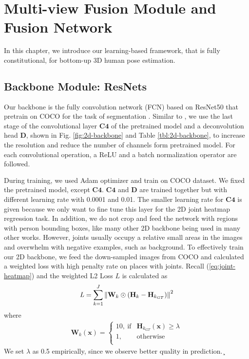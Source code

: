 \chapter{Multi-view Fusion Module and Fusion Network}
In this chapter, we introduce our learning-based framework, that is fully constitutional, for bottom-up 3D human pose estimation. 
\section{Backbone Module: ResNets}
Our backbone is the fully convolution network (FCN) based on ResNet50 that pretrain on COCO for the task of segmentation \cite{resnet50}. Similar to \cite{xiao2018simple}, we use the last stage of the convolutional layer $\bm{C4}$ of the pretrained model and a deconvolution head $\bm{D}$, shown in Fig. \ref{fig:2d-backbone} and Table \ref{tbl:2d-backbone}, to increase the resolution and reduce the number of channels form pretrained model. For each convolutional operation, a ReLU and a batch normalization operator are followed.

During training, we used Adam optimizer and train on COCO dataset. We fixed the pretrained model, except $\bm{C4}$. $\bm{C4}$ and $\bm{D}$ are trained together but with different learning rate with 0.0001 and 0.01. The smaller learning rate for $\bm{C4}$ is given because we only want to fine tune this layer for the 2D joint heatmap regression task. In addition, we do not crop and feed the network with regions with person bounding boxes, like many other 2D backbone being used in many other works. However, joints usually occupy a relative small areas in the images and overwhelm with negative examples, such as background. To effectively train our 2D backbone, we feed the down-sampled images from COCO and calculated a weighted loss with high penalty rate on places with joints. Recall (\ref{eq:joint-heatmap}) and the weighted L2 Loss $\mathit{L}$ is calculated as 
\begin{gather}
\mathit{L} = \sum_{k=1}^J\left\lVert\mathbf{W}_k \odot \left(\mathbf{H}_k - \mathbf{H}_{k_{GT}}\right)\right\rVert^2
\label{eq:joint-heatmap}
\end{gather}
where
\begin{gather}
\mathbf{W}_k(\mathbf{x}) = 
\begin{cases}
	10,\ \text{if} & \mathbf{H}_{k_{GT}}(\mathbf{x})\geq \lambda \\ 
	1,& \text{otherwise}\\
\end{cases}
\end{gather}
We set $\lambda$ as 0.5 empirically, since we observe better quality in prediction.¸


